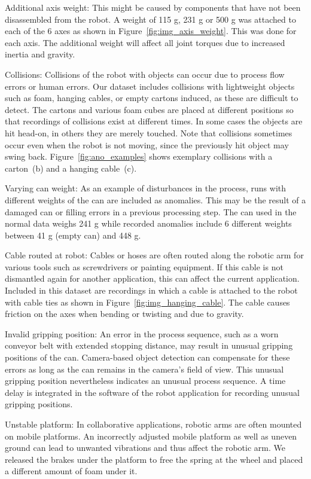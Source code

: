 \documentclass[journal]{IEEEtran}
\newenvironment{packed_enum}{
\begin{itemize}
  \setlength{\itemsep}{3pt}
  \setlength{\parskip}{0pt}
  \setlength{\parsep}{0pt}
}{\end{itemize}}
\begin{document}
\begin{packed_enum}
    \item Additional axis weight:
    This might be caused by components that have not been disassembled from the robot.
    A weight of {115 g, 231 g or 500 g} was attached to each of the 6 axes as shown in Figure~\ref{fig:img_axis_weight}.
    This was done for each axis.
    The additional weight will affect all joint torques due to increased inertia and gravity. 
    \item Collisions:
    Collisions of the robot with objects can occur due to process flow errors or human errors. Our dataset includes collisions with lightweight objects such as foam, hanging cables, or empty cartons induced, as these are difficult to detect.
    The cartons and various foam cubes are placed at different positions so that recordings of collisions exist at different times.
    In some cases the objects are hit head-on, in others they are merely touched. Note that collisions sometimes occur even when the robot is not moving, since the previously hit object may swing back.
    Figure~\ref{fig:ano_examples} shows exemplary collisions with a carton~(b) and a hanging cable~(c).
    \item Varying can weight:
    As an example of disturbances in the process, runs with different weights of the can are included as anomalies.
    This may be the result of a damaged can or filling errors in a previous processing step.
    The can used in the normal data weighs {241 g} while recorded anomalies include 6 different weights between {41 g} (empty can) and {448 g}.
    \item Cable routed at robot:
    Cables or hoses are often routed along the robotic arm for various tools such as screwdrivers or painting equipment.
    If this cable is not dismantled again for another application, this can affect the current application.
    Included in this dataset are recordings in which a cable is attached to the robot with cable ties as shown in Figure~\ref{fig:img_hanging_cable}.
    {The cable causes friction on the axes when bending or twisting and due to gravity.}
    \item Invalid gripping position:
    An error in the process sequence, such as a worn conveyor belt with extended stopping distance, may result in unusual gripping positions of the can.
    Camera-based object detection can compensate for these errors as long as the can remains in the camera's field of view.
    This unusual gripping position nevertheless indicates an unusual process sequence.
    A time delay is integrated in the software of the robot application for recording unusual gripping positions.
    \item Unstable platform:
    In collaborative applications, robotic arms are often mounted on mobile platforms.
    An incorrectly adjusted mobile platform as well as uneven ground can lead to unwanted vibrations and thus affect the robotic arm.
    {We released the brakes under the platform to free the spring at the wheel and placed a different amount of foam under it.}
\end{packed_enum}
\end{document}
